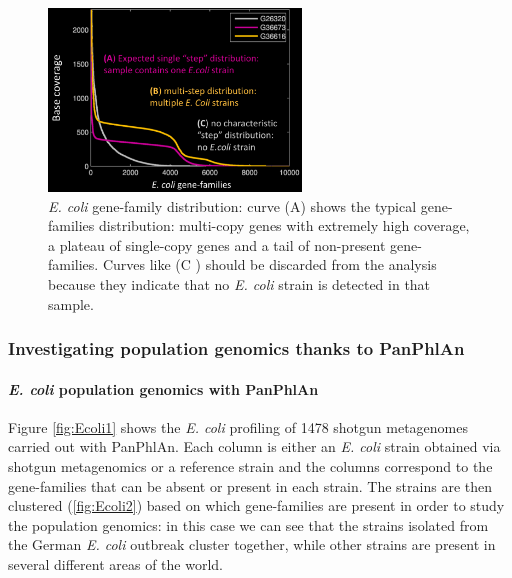     \begin{figure}[!h]
    \centering
    \includegraphics[width=0.6\textwidth]{Coverage.png}
    \caption{\label{fig:pan3}\emph{E. coli} gene-family distribution: curve (A) shows the typical gene-families distribution: multi-copy genes with extremely high coverage, a plateau of single-copy genes and a tail of non-present gene-families. Curves like (C ) should be discarded from the analysis because they indicate that no \emph{E. coli} strain is detected in that sample.}
    \end{figure}

        \subsubsection{Investigating population genomics thanks to PanPhlAn}

            \paragraph{\emph{E. coli} population genomics with PanPhlAn}
            Figure \ref{fig:Ecoli1} shows the \emph{E. coli} profiling of 1478 shotgun metagenomes carried out with PanPhlAn.
            Each column is either an \emph{E. coli} strain obtained via shotgun metagenomics or a reference strain and the columns correspond to the gene-families that can be absent or present in each strain.
            The strains are then clustered (\ref{fig:Ecoli2}) based on which gene-families are present in order to study the population genomics: in this case we can see that the strains isolated from the German \emph{E. coli} outbreak cluster together, while other strains are present in several different areas of the world.

